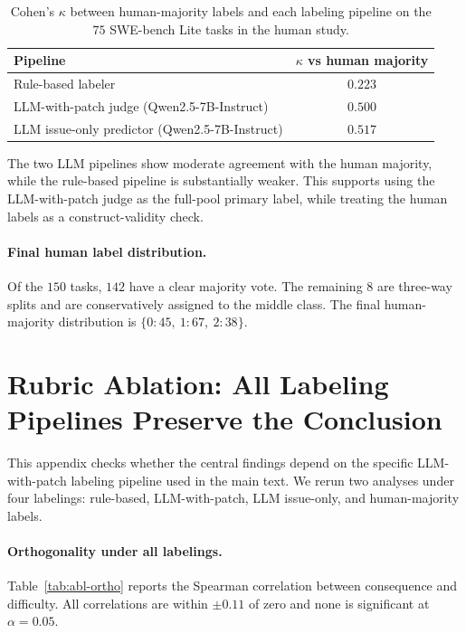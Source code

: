 \documentclass{article}
\begin{document}
\begin{table}[h]
\centering
\caption{Cohen's $\kappa$ between human-majority labels and each
labeling pipeline on the $75$ SWE-bench Lite tasks in the human study.}
\label{tab:human-vs-llm}
\small
\begin{tabular}{lc}
\toprule
Pipeline & $\kappa$ vs human majority \\
\midrule
Rule-based labeler & $0.223$ \\
LLM-with-patch judge (Qwen2.5-7B-Instruct) & $0.500$ \\
LLM issue-only predictor (Qwen2.5-7B-Instruct) & $0.517$ \\
\bottomrule
\end{tabular}
\end{table}

The two LLM pipelines show moderate agreement with the human majority,
while the rule-based pipeline is substantially weaker. This supports
using the LLM-with-patch judge as the full-pool primary label, while
treating the human labels as a construct-validity check.

\paragraph{Final human label distribution.}
Of the $150$ tasks, $142$ have a clear majority vote. The remaining
$8$ are three-way splits and are conservatively assigned to the middle
class. The final human-majority distribution is
$\{0{:}45,\ 1{:}67,\ 2{:}38\}$.

\section{Rubric Ablation: All Labeling Pipelines Preserve the Conclusion}
\label{app:rubric}

This appendix checks whether the central findings depend on the
specific LLM-with-patch labeling pipeline used in the main text. We
rerun two analyses under four labelings: rule-based, LLM-with-patch,
LLM issue-only, and human-majority labels.

\paragraph{Orthogonality under all labelings.}
Table~\ref{tab:abl-ortho} reports the Spearman correlation between
consequence and difficulty. All correlations are within $\pm0.11$ of
zero and none is significant at $\alpha=0.05$.
\end{document}
